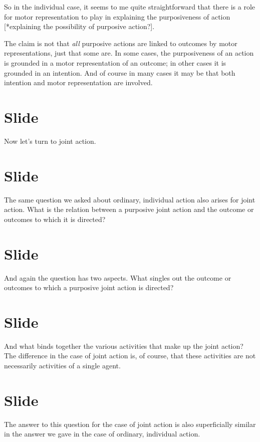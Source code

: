 \documentclass[12pt,\papersize]{extarticle}
\begin{document}
So in the individual case, it seems to me quite straightforward that there is a role for motor representation to play in explaining the purposiveness of action [*explaining the possibility of purposive action?].

The claim is not that \emph{all} purposive actions are linked to outcomes by motor representations, just that some are.
In some cases, the purposiveness of an action is grounded in a motor representation of an outcome; in other cases it is grounded in an intention.
And of course in many cases it may be that both intention and motor representation are involved.



\section{Slide}
Now let’s turn to joint action.



\section{Slide}
The same question we asked about ordinary, individual action also arises for joint action.
What is the relation between a purposive joint action and the outcome or outcomes to which it is directed?




\section{Slide}
And again the question has two aspects.
What singles out the outcome or outcomes to which a purposive joint action is directed?



\section{Slide}
And what binds together the various activities that make up the joint action?
The difference in the case of joint action is, of course, that these activities are not necessarily activities of a single agent.




\section{Slide}
The answer to this question for the case of joint action is also superficially similar in the answer we gave in the case of ordinary, individual action.
\end{document}
